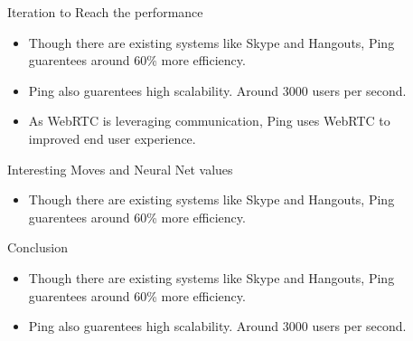 \documentclass[final]{beamer}
\newlength{\sepwid}
\newlength{\onecolwid}
\begin{document}
\begin{frame}[t]
\begin{columns}[t]
\begin{column}{\sepwid}\end{column} %

\begin{column}{\onecolwid} %



\begin{block}{Iteration to Reach the performance}

\begin{itemize}
\item Though there are existing systems like Skype and Hangouts, Ping guarentees around 60\% more efficiency.
\item Ping also guarentees high scalability. Around 3000 users per second.
\item As WebRTC is leveraging communication, Ping uses WebRTC to improved end user experience.
\end{itemize}

\end{block}

\begin{block}{Interesting Moves and Neural Net values}

\begin{itemize}
\item Though there are existing systems like Skype and Hangouts, Ping guarentees around 60\% more efficiency.
\end{itemize}

\end{block}


\begin{block}{Conclusion}

\begin{itemize}
\item Though there are existing systems like Skype and Hangouts, Ping guarentees around 60\% more efficiency.
\item Ping also guarentees high scalability. Around 3000 users per second.
\end{itemize}

\end{block}





\end{column}
\end{columns}
\end{frame}
\end{document}

